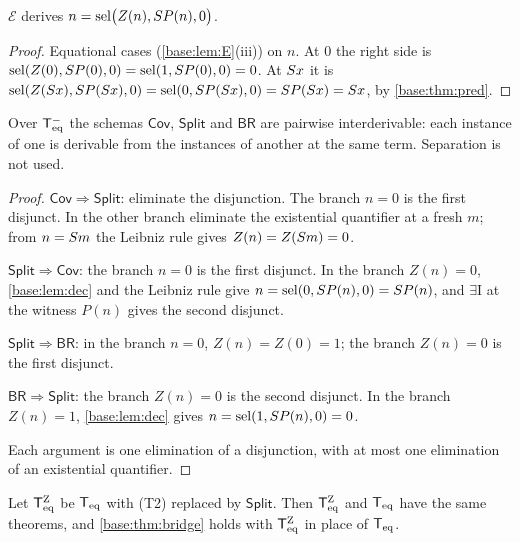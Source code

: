\begin{lemma}[Decomposition]
\label{base:lem:dec}
$\mathcal E$ derives $n=\operatorname{sel}\bigl(Z(n),S P(n),0\bigr)$.
\end{lemma}

\begin{proof}
Equational cases (\cref{base:lem:E}(iii)) on $n$.  At $0$ the right side is
$\operatorname{sel}(Z(0),S P(0),0)=\operatorname{sel}(1,S P(0),0)=0$.  At $S x$ it is
$\operatorname{sel}(Z(S x),S P(S x),0)=\operatorname{sel}(0,S P(S x),0)=S P(S x)
=S x$, by \cref{base:thm:pred}.
\end{proof}

\begin{theorem}
\label{base:thm:split}
Over $\mathsf{T}_{\mathrm{eq}}^{-}$ the schemas $\mathsf{Cov}$, $\mathsf{Split}$ and
$\mathsf{BR}$ are pairwise interderivable: each instance of one is
derivable from the instances of another at the same term.  Separation is
not used.
\end{theorem}

\begin{proof}
$\mathsf{Cov}\Rightarrow\mathsf{Split}$: eliminate the disjunction.  The
branch $n=0$ is the first disjunct.  In the other branch eliminate the
existential quantifier at a fresh $m$; from $n=S m$ the Leibniz rule
gives $Z(n)=Z(S m)=0$.

$\mathsf{Split}\Rightarrow\mathsf{Cov}$: the branch $n=0$ is the first
disjunct.  In the branch $Z(n)=0$, \cref{base:lem:dec} and the Leibniz rule
give $n=\operatorname{sel}(0,S P(n),0)=S P(n)$, and $\exists$I at the witness $P(n)$
gives the second disjunct.

$\mathsf{Split}\Rightarrow\mathsf{BR}$: in the branch $n=0$, $Z(n)=Z(0)=1$;
the branch $Z(n)=0$ is the first disjunct.

$\mathsf{BR}\Rightarrow\mathsf{Split}$: the branch $Z(n)=0$ is the second
disjunct.  In the branch $Z(n)=1$, \cref{base:lem:dec} gives
$n=\operatorname{sel}(1,S P(n),0)=0$.

Each argument is one elimination of a disjunction, with at most one
elimination of an existential quantifier.
\end{proof}

\begin{corollary}
\label{base:cor:split}
Let $\mathsf{T}_{\mathrm{eq}}^{\mathrm{Z}}$ be $\mathsf{T}_{\mathrm{eq}}$ with (T2) replaced by $\mathsf{Split}$.
Then $\mathsf{T}_{\mathrm{eq}}^{\mathrm{Z}}$ and $\mathsf{T}_{\mathrm{eq}}$ have the same theorems, and
\cref{base:thm:bridge} holds with $\mathsf{T}_{\mathrm{eq}}^{\mathrm{Z}}$ in place of $\mathsf{T}_{\mathrm{eq}}$.
\end{corollary}


